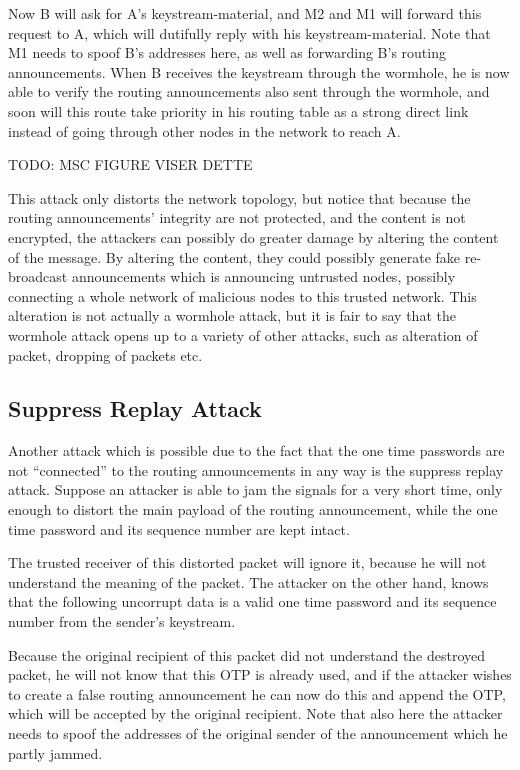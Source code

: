 Now B will ask for A's keystream-material, and M2 and M1 will forward this
request to A, which will dutifully reply with his keystream-material. Note that
M1 needs to spoof B's addresses here, as well as forwarding B's routing
announcements. When B receives the keystream through the wormhole, he is now
able to verify the routing announcements also sent through the wormhole, and
soon will this route take priority in his routing table as a strong direct link
instead of going through other nodes in the network to reach A.

TODO: MSC FIGURE VISER DETTE

This attack only distorts the network topology, but notice that because the
routing announcements' integrity are not protected, and the content is not
encrypted, the attackers can possibly do greater damage by altering the content
of the message. By altering the content, they could possibly generate fake
re-broadcast announcements which is announcing untrusted nodes, possibly
connecting a whole network of malicious nodes to this trusted network. This
alteration is not actually a wormhole attack, but it is fair to say that the
wormhole attack opens up to a variety of other attacks, such as alteration of
packet, dropping of packets etc.

\subsection{Suppress Replay Attack}
Another attack which is possible due to the fact that the one time passwords are
not ``connected'' to the routing announcements in any way is the suppress replay
attack. Suppose an attacker is able to jam the signals for a very short time,
only enough to distort the main payload of the routing announcement, while the
one time password and its sequence number are kept intact.

The trusted receiver of this distorted packet will ignore it, because he will
not understand the meaning of the packet. The attacker on the other hand, knows
that the following uncorrupt data is a valid one time password and its sequence
number from the sender's keystream.

Because the original recipient of this packet did not understand the destroyed
packet, he will not know that this \ac{OTP} is already used, and if the attacker
wishes to create a false routing announcement he can now do this and append the
\ac{OTP}, which will be accepted by the original recipient. Note that also here
the attacker needs to spoof the addresses of the original sender of the
announcement which he partly jammed.

